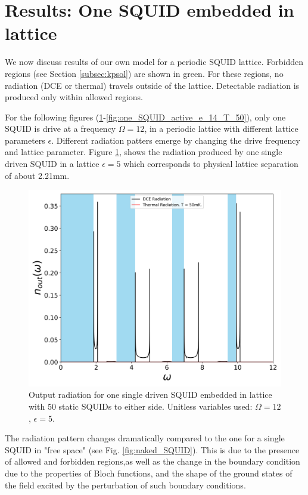 \newpage
\section{Results: One SQUID embedded in lattice}\label{sec:results_one_active}
We now discuss results of our own model for a periodic SQUID lattice. Forbidden regions (see Section \ref{subsec:kpsol}) are shown in green. For these regions, no radiation (DCE or thermal) travels outside of the lattice. Detectable radiation is produced only within allowed regions.

For the following figures (\ref{fig:one_SQUID_active}-\ref{fig:one_SQUID_active_e_14_T_50}), only one SQUID is drive at a frequency $\Omega =12$, in a periodic lattice with different lattice parameters $\epsilon$. Different radiation patters emerge by changing the drive frequency and lattice parameter. Figure \ref{fig:one_SQUID_active}, shows the radiation produced by one single driven SQUID in a lattice $\epsilon=5$ which corresponds to physical lattice separation of about 2.21mm.
%
\begin{figure}[h]
    \centering
    \includegraphics[width=\textwidth, keepaspectratio]{figures/results/one_SQUID_active.png}
    \caption{Output radiation for one single driven SQUID embedded in lattice with 50 static SQUIDs to either side. Unitless variables used: $\Omega=12$, $\epsilon=5$.}
    \label{fig:one_SQUID_active}
\end{figure}
%
\newpage

The radiation pattern changes dramatically compared to the one for a single SQUID in "free space" (see Fig. \ref{fig:naked_SQUID}). This is due to the presence of allowed and forbidden regions,as well as the change in the boundary condition due to the properties of Bloch functions, and the shape of the ground states of the field excited by the perturbation of such boundary conditions.

